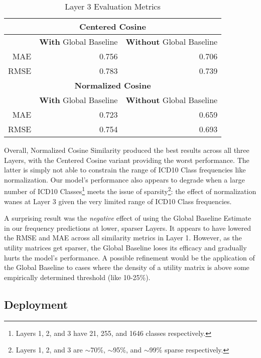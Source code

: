 \documentclass[twoside,11pt]{article}
\begin{document}
{\begin{table}[H]
\begin{center}
\begin{tabular}{ |r||r|r| }
			\multicolumn{3}{|c|}{\textbf{Centered Cosine}} \\
			\hline\hline
    		& \textbf{With} Global Baseline & \textbf{Without} Global Baseline  \\
    		\hline
			MAE & 0.756 & 0.706 \\
			\hline
			RMSE & 0.783 & 0.739 \\

			\hline
			\hline

			\multicolumn{3}{|c|}{\textbf{Normalized Cosine}} \\
			\hline\hline
    		& \textbf{With} Global Baseline & \textbf{Without} Global Baseline  \\
    		\hline
			MAE & 0.723 & 0.659 \\
			\hline
			RMSE & 0.754 & 0.693 \\
			\hline
		\end{tabular}
	\end{center}
	\caption{Layer 3 Evaluation Metrics }
	\label{table:evaluation-3}
\end{table}

Overall, Normalized Cosine Similarity produced the best results across all three Layers, with the Centered Cosine variant providing the worst performance. The latter is simply not able to constrain the range of ICD10 Class frequencies like normalization. Our model's performance also appears to degrade when a large number of ICD10 Classes\footnote{Layers 1, 2, and 3 have 21, 255, and 1646 classes respectively.} meets the issue of sparsity\footnote{Layers 1, 2, and 3 are $\sim$70\%, $\sim$95\%, and $\sim$99\% sparse respectively.}: the effect of normalization wanes at Layer 3 given the very limited range of ICD10 Class frequencies.

A surprising result was the \textit{negative} effect of using the Global Baseline Estimate in our frequency predictions at lower, sparser Layers. It appears to have lowered the RMSE and MAE across all similarity metrics in Layer 1. However, as the utility matrices get sparser, the Global Baseline loses its efficacy and gradually hurts the model's performance. A possible refinement would be the application of the Global Baseline to cases where the density of a utility matrix is above some empirically determined threshold (like 10-25\%).

\subsection{Deployment}

}
\end{document}
